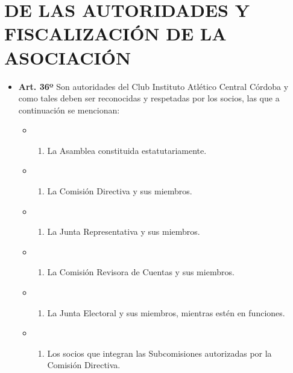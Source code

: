 \documentclass[]{book}
\providecommand{\tightlist}{%
  \setlength{\itemsep}{0pt}\setlength{\parskip}{0pt}}
\begin{document}
\chapter{DE LAS AUTORIDADES Y FISCALIZACIÓN DE LA
ASOCIACIÓN}\label{de-las-autoridades-y-fiscalizacion-de-la-asociacion}

\begin{itemize}
\tightlist
\item
  \textbf{Art. 36º} Son autoridades del Club Instituto Atlético Central
  Córdoba y como tales deben ser reconocidas y respetadas por los
  socios, las que a continuación se mencionan:

  \begin{itemize}
  \item
    \begin{enumerate}
    \def\labelenumi{\alph{enumi})}
    \tightlist
    \item
      La Asamblea constituida estatutariamente.
    \end{enumerate}
  \item
    \begin{enumerate}
    \def\labelenumi{\alph{enumi})}
    \setcounter{enumi}{1}
    \tightlist
    \item
      La Comisión Directiva y sus miembros.
    \end{enumerate}
  \item
    \begin{enumerate}
    \def\labelenumi{\alph{enumi})}
    \setcounter{enumi}{2}
    \tightlist
    \item
      La Junta Representativa y sus miembros.
    \end{enumerate}
  \item
    \begin{enumerate}
    \def\labelenumi{\alph{enumi})}
    \setcounter{enumi}{3}
    \tightlist
    \item
      La Comisión Revisora de Cuentas y sus miembros.
    \end{enumerate}
  \item
    \begin{enumerate}
    \def\labelenumi{\alph{enumi})}
    \setcounter{enumi}{4}
    \tightlist
    \item
      La Junta Electoral y sus miembros, mientras estén en funciones.
    \end{enumerate}
  \item
    \begin{enumerate}
    \def\labelenumi{\alph{enumi})}
    \setcounter{enumi}{5}
    \tightlist
    \item
      Los socios que integran las Subcomisiones autorizadas por la
      Comisión Directiva.
    \end{enumerate}
  \end{itemize}
\end{itemize}
\end{document}
